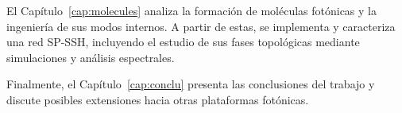 El Capítulo~\ref{cap:molecules} analiza la formación de moléculas fotónicas y la ingeniería de sus modos internos. A partir de estas, se implementa y caracteriza una red SP-SSH, incluyendo el estudio de sus fases topológicas mediante simulaciones y análisis espectrales.

Finalmente, el Capítulo~\ref{cap:conclu} presenta las conclusiones del trabajo y discute posibles extensiones hacia otras plataformas fotónicas.



